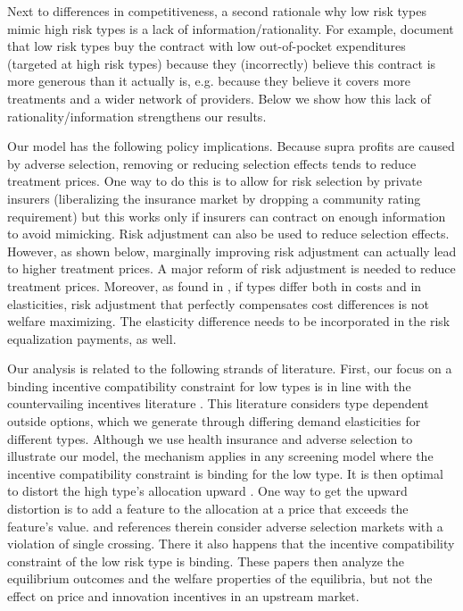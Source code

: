 \documentclass[12pt,english,a4paper]{article}
\begin{document}
Next to differences in competitiveness, a second rationale why low risk types mimic high risk types is a lack of information/rationality. For example, \cite{handel-2015-healt-insur-human} document that low risk types buy the contract with low out-of-pocket expenditures (targeted at high risk types) because they (incorrectly) believe this contract is more generous than it actually is, e.g. because they believe it covers more treatments and a wider network of providers. Below we show how this lack of rationality/information strengthens our results.

Our model has the following policy implications. Because supra profits are caused by adverse selection, removing or reducing selection effects tends to reduce treatment prices. One way to do this is to allow for risk selection by private insurers (liberalizing the insurance market by dropping a community rating requirement) but this works only if insurers can contract on enough information to avoid mimicking. Risk adjustment can also be used to reduce selection effects. However, as shown below, marginally improving risk adjustment can actually lead to higher treatment prices. A major reform of risk adjustment is needed to reduce treatment prices. Moreover, as found in \cite{bijlsma2014}, if types differ both in costs and in elasticities, risk adjustment that perfectly compensates cost differences is not welfare maximizing. The elasticity difference needs to be incorporated in the risk equalization payments, as well.

Our analysis is related to the following strands of literature. First, our focus on a binding incentive compatibility constraint for low types is in line with the countervailing incentives literature \citep{LEWIS1989294}. This literature considers type dependent outside options, which we generate through differing demand elasticities for different types. Although we use health insurance and adverse selection to illustrate our model, the mechanism applies in any screening model where the incentive compatibility constraint is binding for the low type. It is then optimal to distort the high type's allocation upward \citep{laf02}. One way to get the upward distortion is to add a feature to the allocation at a price that exceeds the feature's value. \cite{BooneS13} and references therein consider adverse selection markets with a violation of single crossing. There it also happens that the incentive compatibility constraint of the low risk type is binding. These papers then analyze the equilibrium outcomes and the welfare properties of the equilibria, but not the effect on price and innovation incentives in an upstream market. 
\end{document}
